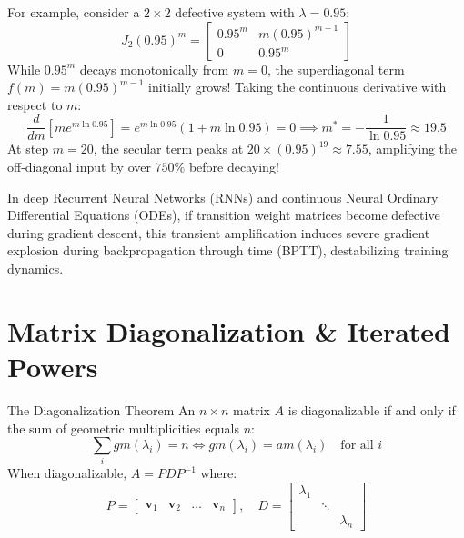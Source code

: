 For example, consider a $2 \times 2$ defective system with $\lambda = 0.95$:
\begin{equation}
J_2(0.95)^m = \begin{bmatrix} 0.95^m & m(0.95)^{m-1} \\ 0 & 0.95^m \end{bmatrix}
\end{equation}
While $0.95^m$ decays monotonically from $m = 0$, the superdiagonal term $f(m) = m(0.95)^{m-1}$ initially grows! Taking the continuous derivative with respect to $m$:
\begin{equation}
\frac{d}{dm} [m e^{m \ln 0.95}] = e^{m \ln 0.95} (1 + m \ln 0.95) = 0 \implies m^* = -\frac{1}{\ln 0.95} \approx 19.5
\end{equation}
At step $m = 20$, the secular term peaks at $20 \times (0.95)^{19} \approx 7.55$, amplifying the off-diagonal input by over \textbf{$750\%$} before decaying!

In deep Recurrent Neural Networks (RNNs) and continuous Neural Ordinary Differential Equations (ODEs), if transition weight matrices become defective during gradient descent, this transient amplification induces severe gradient explosion during backpropagation through time (BPTT), destabilizing training dynamics.

\section{Matrix Diagonalization \& Iterated Powers}

\begin{theorembox}{The Diagonalization Theorem}
An $n \times n$ matrix $A$ is diagonalizable if and only if the sum of geometric multiplicities equals $n$:
\begin{equation}
\sum_{i} gm(\lambda_i) = n \iff gm(\lambda_i) = am(\lambda_i) \quad \text{for all } i
\end{equation}
When diagonalizable, $A = P D P^{-1}$ where:
\begin{equation}
P = \begin{bmatrix} \mathbf{v}_1 & \mathbf{v}_2 & \dots & \mathbf{v}_n \end{bmatrix}, \quad D = \begin{bmatrix} \lambda_1 & & \\ & \ddots & \\ & & \lambda_n \end{bmatrix}
\label{eq:diagonalization_decomp}
\end{equation}
\end{theorembox}

